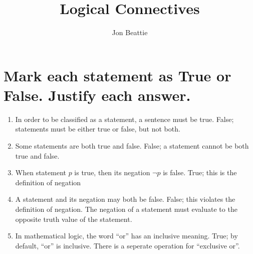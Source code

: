 \documentclass[11pt]{article} %
\title{Logical Connectives}
\author{Jon Beattie}
\begin{document}
\maketitle

\section{Mark each statement as True or False. Justify each answer.}
\begin{enumerate}
	\item In order to be classified as a statement, a sentence must be true.
	\subitem False; statements must be either true or false, but not both.
	
	\item Some statements are both true and false.
	\subitem False; a statement cannot be both true and false.
	
	\item When statement $p$ is true, then its negation $\neg p$ is false.
	\subitem True; this is the definition of negation
	
	\item A statement and its negation may both be false.
	\subitem False; this violates the definition of negation. The negation of a statement must evaluate to the opposite truth value of the statement.
	
	\item In mathematical logic, the word ``or'' has an inclusive meaning.
	\subitem True; by default, ``or'' is inclusive. There is a seperate operation for ``exclusive or''.
\end{enumerate}
\end{document}
